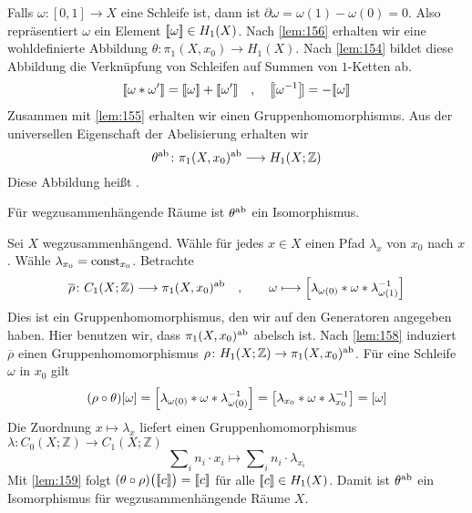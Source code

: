 Falls $\omega \colon [0,1] \to X$ eine Schleife ist, dann ist $\partial \omega = \omega(1)- \omega(0)=0$. 
Also repräsentiert $\omega$ ein Element $\bbenbrace{\omega} \in H_1(X)$. 
Nach \autoref{lem:156} erhalten wir eine wohldefinierte Abbildung $\theta \colon \pi_1(X,x_0) \to H_1(X)$. 
Nach \autoref{lem:154} bildet diese Abbildung die Verknüpfung von Schleifen auf Summen von $1$-Ketten ab.
\begin{align*}
	\bbenbrace*{\omega * \omega'} = \bbenbrace*{\omega} + \bbenbrace*{\omega'} \quad ,\quad  \bbenbrace*{\omega ^{-1}} = - \bbenbrace*{\omega}
\end{align*}
Zusammen mit \autoref{lem:155} erhalten wir einen Gruppenhomomorphismus. 
Aus der universellen Eigenschaft der Abelisierung erhalten wir 
\[
	\theta^{\ab} \colon \pi_1(X,x_0)^{\ab} \longrightarrow H_1(X;\mathbb{Z})
\]
Diese Abbildung heißt .

\begin{satz}[{name={Hurewicz}}]
	Für wegzusammenhängende Räume ist $\theta^{\ab}$ ein Isomorphismus.
\end{satz} 
\begin{beweis}
	Sei $X$ wegzusammenhängend. Wähle für jedes $x \in X$ einen Pfad $\lambda_x$ von $x_0$ nach $x$. Wähle $\lambda_{x_0} = \const_{x_0}$. Betrachte 
	\[
		\overline{\rho} \colon C_1(X;\mathbb{Z}) \longrightarrow \pi_1(X,x_0)^{\ab} \quad , 
		\qquad  \omega \longmapsto \benbrace*{\lambda_{\omega(0)} * \omega * \lambda_{\omega(1)}^{-1}}
	\]
	Dies ist ein Gruppenhomomorphismus, den wir auf den Generatoren angegeben haben. 
	Hier benutzen wir, dass $\pi_1(X,x_0)^{\ab}$ abelsch ist.
	Nach \autoref{lem:158} induziert $\overline{\rho}$ einen Gruppenhomomorphismus $\rho \colon H_1(X;\mathbb{Z}) \to \pi_1(X,x_0)^{\ab}$. 
	Für eine Schleife $\omega$ in $x_0$ gilt
	\begin{align*}
		(\rho \circ \theta)[\omega] = \benbrace*{\lambda_{\omega(0)} * \omega * \lambda_{\omega(0)} ^{-1}} = \benbrace*{\lambda_{x_0} * \omega * \lambda_{x_0}^{-1}}=[\omega] 
	\end{align*}
	Die Zuordnung $x \mapsto \lambda_x$ liefert einen Gruppenhomomorphismus $\lambda \colon C_0(X;\mathbb{Z}) \to C_1(X;\mathbb{Z})$  
	\[
		\sum\nolimits_{i} n_i \cdot x_i  \longmapsto \sum\nolimits_i n_i \cdot \lambda_{x_i}
	\]
	Mit \autoref{lem:159} folgt $(\theta \circ \rho)\enbrace[\big]{\bbenbrace{c}} = \bbenbrace{c}$ für alle $\bbenbrace{c} \in H_1(X)$. 
	Damit ist $\theta^{\ab}$ ein Isomorphismus für wegzusammenhängende Räume $X$.
\end{beweis}

